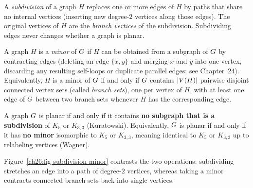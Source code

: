 \begin{definition}[Subdivision]
A \emph{subdivision} of a graph $H$ replaces one or more edges of $H$ by paths that share
no internal vertices (inserting new degree-$2$ vertices along those edges). The original
vertices of $H$ are the \emph{branch vertices} of the subdivision. Subdividing edges never
changes whether a graph is planar.
\end{definition}

\begin{definition}[Minor]
A graph $H$ is a \emph{minor} of $G$ if $H$ can be obtained from a subgraph of $G$ by
contracting edges (deleting an edge $\{x,y\}$ and merging $x$ and $y$ into one vertex,
discarding any resulting self-loops or duplicate parallel edges; see Chapter~24).
Equivalently, $H$ is a minor of $G$ if and only if $G$ contains $\lvert V(H)\rvert$
pairwise disjoint connected vertex sets (called \emph{branch sets}), one per vertex of $H$,
with at least one edge of $G$ between two branch sets whenever $H$ has the corresponding
edge.
\end{definition}

\begin{theorem}
\label{ch26:thm-kuratowski}
A graph $G$ is planar if and only if it contains \textbf{no subgraph that is a
subdivision} of $K_5$ or $K_{3,3}$ (Kuratowski). Equivalently, $G$ is planar if and
only if it has \textbf{no minor} isomorphic to $K_5$ or $K_{3,3}$, meaning identical to
$K_5$ or $K_{3,3}$ up to relabeling vertices (Wagner).
\end{theorem}

Figure~\ref{ch26:fig-subdivision-minor} contrasts the two operations: subdividing stretches
an edge into a path of degree-$2$ vertices, whereas taking a minor contracts connected
branch sets back into single vertices.


